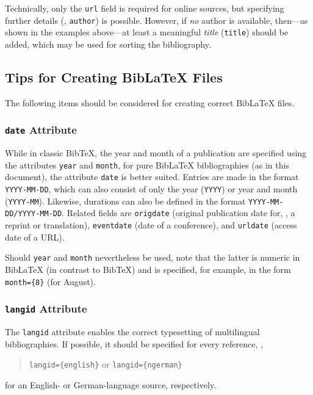Technically, only the \texttt{url} field is required for online
sources, but specifying further details (\eg, \texttt{author}) is possible.
However, if \emph{no} author is available, then---as shown in the examples
above---at least a meaningful \emph{title} (\texttt{title}) should be added,
which may be used for sorting the bibliography.

\subsection{Tips for Creating BibLaTeX Files}
\label{sec:tips-on-biblatex}

The following items should be considered for creating correct BibLaTeX
files.

\subsubsection{\texttt{date} Attribute}

While in classic BibTeX, the year and month of a publication are specified using
the attributes \texttt{year} and \texttt{month}, for pure BibLaTeX
bibliographies (as in this document), the attribute \texttt{date} is better
suited. Entries are made in the format \texttt{YYYY-MM-DD}, which can also
consist of only the year (\texttt{YYYY}) or year and month (\texttt{YYYY-MM}).
Likewise, durations can also be defined in the format
\texttt{YYYY-MM-DD/YYYY-MM-DD}. Related fields are \texttt{origdate} (original
publication date for, \eg, a reprint or translation), \texttt{eventdate} (date
of a conference), and \texttt{urldate} (access date of a URL).

Should \texttt{year} and \texttt{month} nevertheless be used, note that the
latter is numeric in BibLaTeX (in contrast to BibTeX) and is specified,
for example, in the form \verb!month={8}! (for August).

\subsubsection{\texttt{langid} Attribute}

The \texttt{langid} attribute enables the correct typesetting of multilingual
bibliographies. If possible, it should be specified for every reference, \eg,
%
\begin{quote}
\verb!langid={english}! \quad or \quad \verb!langid={ngerman}!
\end{quote}
%
for an English- or German-language source, respectively.

